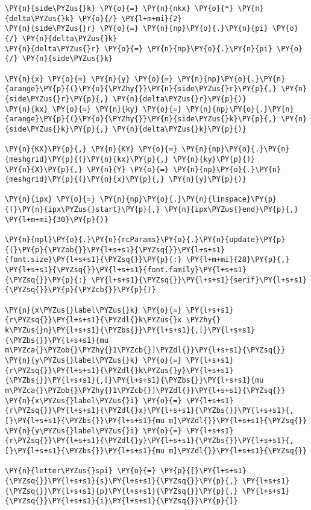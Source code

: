 \begin{Verbatim}[commandchars=\\\{\}]
\PY{n}{side\PYZus{}k} \PY{o}{=} \PY{n}{nkx} \PY{o}{*} \PY{n}{delta\PYZus{}k} \PY{o}{/} \PY{l+m+mi}{2}
\PY{n}{side\PYZus{}r} \PY{o}{=} \PY{n}{np}\PY{o}{.}\PY{n}{pi} \PY{o}{/} \PY{n}{delta\PYZus{}k}
\PY{n}{delta\PYZus{}r} \PY{o}{=} \PY{n}{np}\PY{o}{.}\PY{n}{pi} \PY{o}{/} \PY{n}{side\PYZus{}k}

\PY{n}{x} \PY{o}{=} \PY{n}{y} \PY{o}{=} \PY{n}{np}\PY{o}{.}\PY{n}{arange}\PY{p}{(}\PY{o}{\PYZhy{}}\PY{n}{side\PYZus{}r}\PY{p}{,} \PY{n}{side\PYZus{}r}\PY{p}{,} \PY{n}{delta\PYZus{}r}\PY{p}{)}
\PY{n}{kx} \PY{o}{=} \PY{n}{ky} \PY{o}{=} \PY{n}{np}\PY{o}{.}\PY{n}{arange}\PY{p}{(}\PY{o}{\PYZhy{}}\PY{n}{side\PYZus{}k}\PY{p}{,} \PY{n}{side\PYZus{}k}\PY{p}{,} \PY{n}{delta\PYZus{}k}\PY{p}{)}

\PY{n}{KX}\PY{p}{,} \PY{n}{KY} \PY{o}{=} \PY{n}{np}\PY{o}{.}\PY{n}{meshgrid}\PY{p}{(}\PY{n}{kx}\PY{p}{,} \PY{n}{ky}\PY{p}{)}
\PY{n}{X}\PY{p}{,} \PY{n}{Y} \PY{o}{=} \PY{n}{np}\PY{o}{.}\PY{n}{meshgrid}\PY{p}{(}\PY{n}{x}\PY{p}{,} \PY{n}{y}\PY{p}{)}

\PY{n}{ipx} \PY{o}{=} \PY{n}{np}\PY{o}{.}\PY{n}{linspace}\PY{p}{(}\PY{n}{ipx\PYZus{}start}\PY{p}{,} \PY{n}{ipx\PYZus{}end}\PY{p}{,} \PY{l+m+mi}{30}\PY{p}{)}

\PY{n}{mpl}\PY{o}{.}\PY{n}{rcParams}\PY{o}{.}\PY{n}{update}\PY{p}{(}\PY{p}{\PYZob{}}\PY{l+s+s1}{\PYZsq{}}\PY{l+s+s1}{font.size}\PY{l+s+s1}{\PYZsq{}}\PY{p}{:} \PY{l+m+mi}{28}\PY{p}{,} \PY{l+s+s1}{\PYZsq{}}\PY{l+s+s1}{font.family}\PY{l+s+s1}{\PYZsq{}}\PY{p}{:} \PY{l+s+s1}{\PYZsq{}}\PY{l+s+s1}{serif}\PY{l+s+s1}{\PYZsq{}}\PY{p}{\PYZcb{}}\PY{p}{)}

\PY{n}{x\PYZus{}label\PYZus{}k} \PY{o}{=} \PY{l+s+s1}{r\PYZsq{}}\PY{l+s+s1}{\PYZdl{}k\PYZus{}x \PYZhy{} k\PYZus{}n}\PY{l+s+s1}{\PYZbs{}}\PY{l+s+s1}{,[}\PY{l+s+s1}{\PYZbs{}}\PY{l+s+s1}{mu m\PYZca{}\PYZob{}\PYZhy{}1\PYZcb{}]\PYZdl{}}\PY{l+s+s1}{\PYZsq{}}
\PY{n}{y\PYZus{}label\PYZus{}k} \PY{o}{=} \PY{l+s+s1}{r\PYZsq{}}\PY{l+s+s1}{\PYZdl{}k\PYZus{}y}\PY{l+s+s1}{\PYZbs{}}\PY{l+s+s1}{,[}\PY{l+s+s1}{\PYZbs{}}\PY{l+s+s1}{mu m\PYZca{}\PYZob{}\PYZhy{}1\PYZcb{}]\PYZdl{}}\PY{l+s+s1}{\PYZsq{}}
\PY{n}{x\PYZus{}label\PYZus{}i} \PY{o}{=} \PY{l+s+s1}{r\PYZsq{}}\PY{l+s+s1}{\PYZdl{}x}\PY{l+s+s1}{\PYZbs{}}\PY{l+s+s1}{,[}\PY{l+s+s1}{\PYZbs{}}\PY{l+s+s1}{mu m]\PYZdl{}}\PY{l+s+s1}{\PYZsq{}}
\PY{n}{y\PYZus{}label\PYZus{}i} \PY{o}{=} \PY{l+s+s1}{r\PYZsq{}}\PY{l+s+s1}{\PYZdl{}y}\PY{l+s+s1}{\PYZbs{}}\PY{l+s+s1}{,[}\PY{l+s+s1}{\PYZbs{}}\PY{l+s+s1}{mu m]\PYZdl{}}\PY{l+s+s1}{\PYZsq{}}

\PY{n}{letter\PYZus{}spi} \PY{o}{=} \PY{p}{[}\PY{l+s+s1}{\PYZsq{}}\PY{l+s+s1}{s}\PY{l+s+s1}{\PYZsq{}}\PY{p}{,} \PY{l+s+s1}{\PYZsq{}}\PY{l+s+s1}{p}\PY{l+s+s1}{\PYZsq{}}\PY{p}{,} \PY{l+s+s1}{\PYZsq{}}\PY{l+s+s1}{i}\PY{l+s+s1}{\PYZsq{}}\PY{p}{]}


\end{Verbatim}
